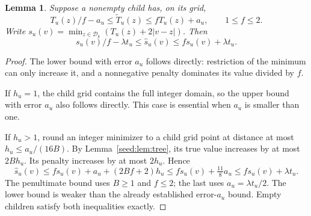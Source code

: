 \documentclass[11pt]{article}
\newtheorem{lemma}[theorem]{Lemma}
\theoremstyle{definition}
\newcommand{\1}{\mathbf 1}
\begin{document}
\begin{lemma}\label{seed:lem:grid}
Suppose a nonempty child has, on its grid,
\[
 T_u(z)/f-a_u\le\widetilde T_u(z)\le fT_u(z)+a_u,
 \qquad 1\le f\le2.
\]
Write $s_u(v)=\min_{z\in\mathcal D_k}(T_u(z)+2|v-z|)$. Then
\[
 s_u(v)/f-\lambda t_u\le\widehat s_u(v)
                  \le f s_u(v)+\lambda t_u.
\]
\end{lemma}
\begin{proof}
The lower bound with error $a_u$ follows directly: restriction of the
minimum can only increase it, and a nonnegative penalty dominates its
value divided by $f$.

If $h_u=1$, the child grid contains the full integer domain, so the upper
bound with error $a_u$ also follows directly. This case is essential when
$a_u$ is smaller than one.

If $h_u>1$, round an integer minimizer to a child grid point at distance
at most $h_u\le a_u/(16B)$. By Lemma~\ref{seed:lem:tree}, its true
value increases by at most $2Bh_u$. Its penalty increases by at most
$2h_u$. Hence
\[
 \widehat s_u(v)\le f s_u(v)+a_u+(2Bf+2)h_u
                  \le f s_u(v)+\tfrac{11}{8}a_u
                  \le f s_u(v)+\lambda t_u.
\]
The penultimate bound uses $B\ge1$ and $f\le2$; the last uses
$a_u=\lambda t_u/2$. The lower bound is weaker than the already established
error-$a_u$ bound. Empty children satisfy both inequalities exactly.
\end{proof}
\end{document}

